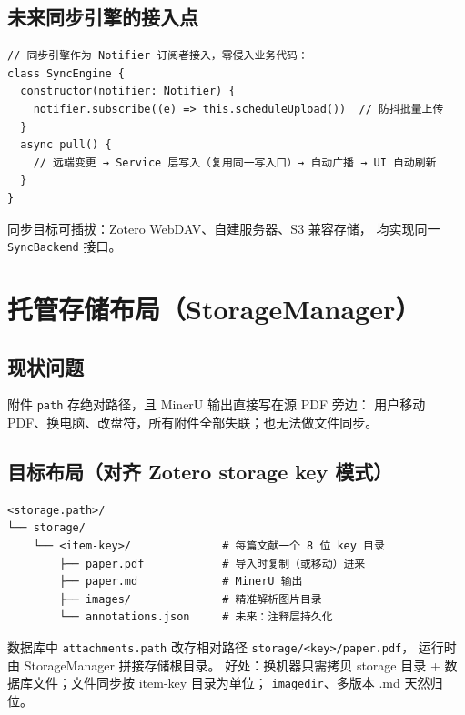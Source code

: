 \documentclass[12pt, a4paper]{article}
\begin{document}
\subsection{未来同步引擎的接入点}

\begin{lstlisting}[language={}]
// 同步引擎作为 Notifier 订阅者接入，零侵入业务代码：
class SyncEngine {
  constructor(notifier: Notifier) {
    notifier.subscribe((e) => this.scheduleUpload())  // 防抖批量上传
  }
  async pull() {
    // 远端变更 → Service 层写入（复用同一写入口）→ 自动广播 → UI 自动刷新
  }
}
\end{lstlisting}

同步目标可插拔：Zotero WebDAV、自建服务器、S3 兼容存储，
均实现同一 \texttt{SyncBackend} 接口。

\section{托管存储布局（StorageManager）}

\subsection{现状问题}

附件 \texttt{path} 存绝对路径，且 MinerU 输出直接写在源 PDF 旁边：
用户移动 PDF、换电脑、改盘符，所有附件全部失联；也无法做文件同步。

\subsection{目标布局（对齐 Zotero storage key 模式）}

\begin{lstlisting}[language={},numbers=none]
<storage.path>/
└── storage/
    └── <item-key>/              # 每篇文献一个 8 位 key 目录
        ├── paper.pdf            # 导入时复制（或移动）进来
        ├── paper.md             # MinerU 输出
        ├── images/              # 精准解析图片目录
        └── annotations.json     # 未来：注释层持久化
\end{lstlisting}

数据库中 \texttt{attachments.path} 改存相对路径 \texttt{storage/<key>/paper.pdf}，
运行时由 StorageManager 拼接存储根目录。
好处：换机器只需拷贝 storage 目录 + 数据库文件；文件同步按 item-key 目录为单位；
\texttt{imagedir}、多版本 .md 天然归位。
\end{document}
